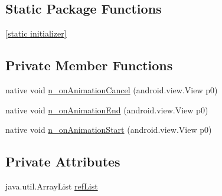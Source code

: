 \subsection*{Static Package Functions}
\begin{CompactItemize}
\item 
\hyperlink{classmono_1_1android_1_1support_1_1v4_1_1view_1_1_view_property_animator_listener_implementor_51d87c904a2ee6a2607464001a2ef685}{\mbox{[}static initializer\mbox{]}}
\end{CompactItemize}
\subsection*{Private Member Functions}
\begin{CompactItemize}
\item 
native void \hyperlink{classmono_1_1android_1_1support_1_1v4_1_1view_1_1_view_property_animator_listener_implementor_fc5b96b965260534b5f3cdb5f37cd75e}{n\_\-onAnimationCancel} (android.view.View p0)
\item 
native void \hyperlink{classmono_1_1android_1_1support_1_1v4_1_1view_1_1_view_property_animator_listener_implementor_dc6cdd90fed608f183f252bdf12ae769}{n\_\-onAnimationEnd} (android.view.View p0)
\item 
native void \hyperlink{classmono_1_1android_1_1support_1_1v4_1_1view_1_1_view_property_animator_listener_implementor_00aa41974a1a2e32d5a6d984ae2489ac}{n\_\-onAnimationStart} (android.view.View p0)
\end{CompactItemize}
\subsection*{Private Attributes}
\begin{CompactItemize}
\item 
java.util.ArrayList \hyperlink{classmono_1_1android_1_1support_1_1v4_1_1view_1_1_view_property_animator_listener_implementor_e76bbdc89bdf55eecf733f6ae1922a25}{refList}
\end{CompactItemize}


